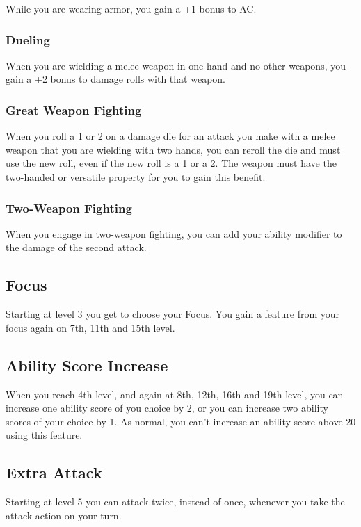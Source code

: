 While you are wearing armor, you gain a +1 bonus to AC.

\subsubsection{Dueling}

When you are wielding a melee weapon in one hand and no other weapons, you gain a +2 bonus to damage rolls with that weapon.

\subsubsection{Great Weapon Fighting}

When you roll a 1 or 2 on a damage die for an attack you make with a melee weapon that you are wielding with two hands, you can reroll the die and must use the new roll, even if the new roll is a 1 or a 2. The weapon must have the two-handed or versatile property for you to gain this benefit.

\subsubsection{Two-Weapon Fighting}

When you engage in two-weapon fighting, you can add your ability modifier to the damage of the second attack.

\subsection{Focus}
Starting at level 3 you get to choose your Focus. You gain a feature from your focus again on 7th, 11th and 15th level.

\subsection{Ability Score Increase}

When you reach 4th level, and again at 8th, 12th, 16th and 19th level, you can increase one ability score of you choice by 2, or you can increase two ability scores of your choice by 1. As normal, you can't increase an ability score above 20 using this feature.

\subsection{Extra Attack}

Starting at level 5 you can attack twice, instead of once, whenever you take the attack action on your turn.

